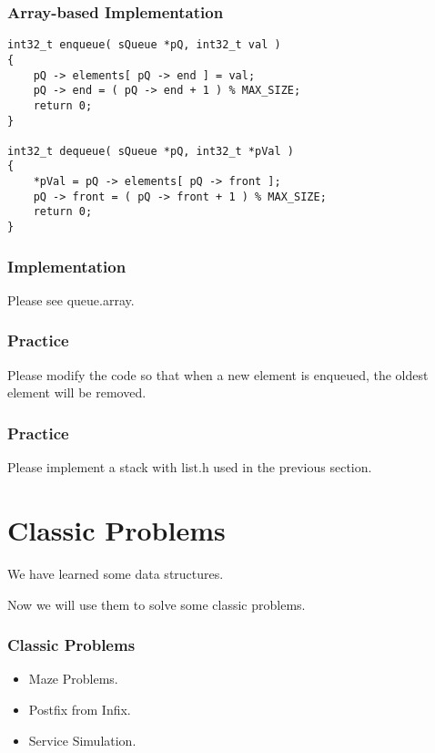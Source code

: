\documentclass[11pt]{beamer}
\begin{document}
\begin{frame}[fragile]
\frametitle{Array-based Implementation}
\begin{lstlisting}
int32_t enqueue( sQueue *pQ, int32_t val )
{
    pQ -> elements[ pQ -> end ] = val;
    pQ -> end = ( pQ -> end + 1 ) % MAX_SIZE;
    return 0;
}

int32_t dequeue( sQueue *pQ, int32_t *pVal )
{
    *pVal = pQ -> elements[ pQ -> front ]; 
    pQ -> front = ( pQ -> front + 1 ) % MAX_SIZE;
    return 0;
}
\end{lstlisting}
\end{frame}

\begin{frame}
\frametitle{Implementation}
Please see queue.array.
\end{frame}

\begin{frame}
\frametitle{Practice}
Please modify the code so that when a new element is enqueued, the oldest element will be removed.
\end{frame}

\begin{frame}
\frametitle{Practice}
Please implement a stack with list.h used in the previous section.
\end{frame}

\section{Classic Problems}

\begin{frame}
\Large
\begin{center}
We have learned some data structures. 

Now we will use them to solve some classic problems.
\end{center}
\end{frame}

\begin{frame}
\frametitle{Classic Problems}
\begin{itemize}
\item Maze Problems.
\item Postfix from Infix.
\item Service Simulation.
\end{itemize}
\end{frame}
\end{document}
